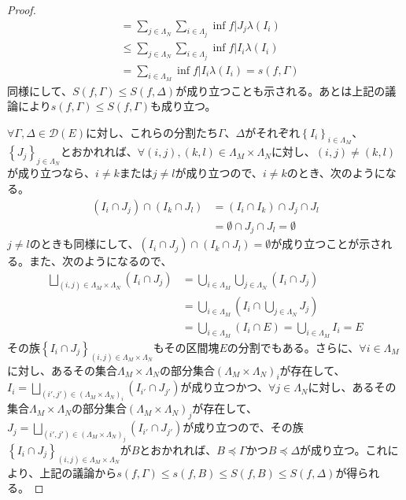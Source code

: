 \documentclass[dvipdfmx]{jsarticle}
\begin{document}
\begin{proof}
\begin{align*}
&= \sum_{j \in \varLambda_{N}} {\sum_{i \in \varLambda_{j}} {\inf{f|J_{j}}\lambda\left( I_{i} \right)}}\\
&\leq \sum_{j \in \varLambda_{N}} {\sum_{i \in \varLambda_{j}} {\inf{f|I_{i}}\lambda\left( I_{i} \right)}}\\
&= \sum_{i \in \varLambda_{M}} {\inf{f|I_{i}}\lambda\left( I_{i} \right)} = s(f,\varGamma)
\end{align*}
同様にして、$S(f,\varGamma) \leq S(f,\varDelta)$が成り立つことも示される。あとは上記の議論により$s(f,\varGamma) \leq S(f,\varGamma)$も成り立つ。\par
$\forall\varGamma,\varDelta \in \mathcal{D}(E)$に対し、これらの分割たち$\varGamma$、$\varDelta$がそれぞれ$\left\{ I_{i} \right\}_{i \in \varLambda_{M}}$、$\left\{ J_{j} \right\}_{j \in \varLambda_{N}}$とおかれれば、$\forall(i,j),(k,l) \in \varLambda_{M} \times \varLambda_{N}$に対し、$(i,j) \neq (k,l)$が成り立つなら、$i \neq k$または$j \neq l$が成り立つので、$i \neq k$のとき、次のようになる。
\begin{align*}
\left( I_{i} \cap J_{j} \right) \cap \left( I_{k} \cap J_{l} \right) &= \left( I_{i} \cap I_{k} \right) \cap J_{j} \cap J_{l}\\
&= \emptyset \cap J_{j} \cap J_{l} = \emptyset
\end{align*}
$j \neq l$のときも同様にして、$\left( I_{i} \cap J_{j} \right) \cap \left( I_{k} \cap J_{l} \right) = \emptyset$が成り立つことが示される。また、次のようになるので、
\begin{align*}
\bigsqcup_{(i,j) \in \varLambda_{M} \times \varLambda_{N}} \left( I_{i} \cap J_{j} \right) &= \bigcup_{i \in \varLambda_{M}} {\bigcup_{j \in \varLambda_{N}} \left( I_{i} \cap J_{j} \right)}\\
&= \bigcup_{i \in \varLambda_{M}} \left( I_{i} \cap \bigcup_{j \in \varLambda_{N}} J_{j} \right)\\
&= \bigcup_{i \in \varLambda_{M}} \left( I_{i} \cap E \right) = \bigcup_{i \in \varLambda_{M}} I_{i} = E
\end{align*}
その族$\left\{ I_{i} \cap J_{j} \right\}_{(i,j) \in \varLambda_{M} \times \varLambda_{N}}$もその区間塊$E$の分割でもある。さらに、$\forall i \in \varLambda_{M}$に対し、あるその集合$\varLambda_{M} \times \varLambda_{N}$の部分集合$\left( \varLambda_{M} \times \varLambda_{N} \right)_{i}$が存在して、$I_{i} = \bigsqcup_{\left( i',j' \right) \in \left( \varLambda_{M} \times \varLambda_{N} \right)_{i}} \left( I_{i'} \cap J_{j'} \right)$が成り立つかつ、$\forall j \in \varLambda_{N}$に対し、あるその集合$\varLambda_{M} \times \varLambda_{N}$の部分集合$\left( \varLambda_{M} \times \varLambda_{N} \right)_{j}$が存在して、$J_{j} = \bigsqcup_{\left( i',j' \right) \in \left( \varLambda_{M} \times \varLambda_{N} \right)_{j}} \left( I_{i'} \cap J_{j'} \right)$が成り立つので、その族$\left\{ I_{i} \cap J_{j} \right\}_{(i,j) \in \varLambda_{M} \times \varLambda_{N}}$が$B$とおかれれば、$B \preccurlyeq \varGamma$かつ$B \preccurlyeq \varDelta$が成り立つ。これにより、上記の議論から$s(f,\varGamma) \leq s(f,B) \leq S(f,B) \leq S(f,\varDelta)$が得られる。\par

\end{proof}
\end{document}
